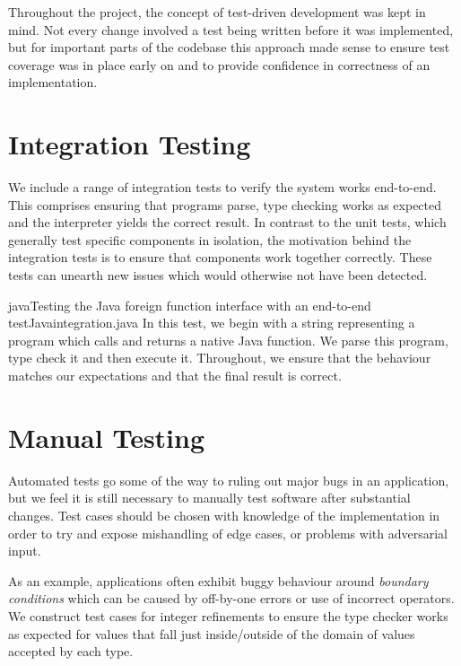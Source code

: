 \documentclass[a4paper,openany,12pt]{book}
\begin{document}
Throughout the project, the concept of test-driven development was kept in mind.
Not every change involved a test being written before it was implemented, but for important parts of the codebase this approach made sense to ensure test coverage was in place early on and to provide confidence in correctness of an implementation.


\section{Integration Testing}

We include a range of integration tests to verify the system works end-to-end.
This comprises ensuring that programs parse, type checking works as expected and the interpreter yields the correct result.
In contrast to the unit tests, which generally test specific components in isolation, the motivation behind the integration tests is to ensure that components work together correctly.
These tests can unearth new issues which would otherwise not have been detected.

\begin{mycodefile}{java}{\label{code:integration:1}Testing the Java foreign function interface with an end-to-end test}{Java}{integration.java}
In this test, we begin with a string representing a program which calls and returns a native Java function.
We parse this program, type check it and then execute it.
Throughout, we ensure that the behaviour matches our expectations and that the final result is correct.
\end{mycodefile}

\section{Manual Testing}

Automated tests go some of the way to ruling out major bugs in an application, but we feel it is still necessary to manually test software after substantial changes.
Test cases should be chosen with knowledge of the implementation in order to try and expose mishandling of edge cases, or problems with adversarial input.

As an example, applications often exhibit buggy behaviour around \emph{boundary conditions} which can be caused by off-by-one errors or use of incorrect operators.
We construct test cases for integer refinements to ensure the type checker works as expected for values that fall just inside/outside of the domain of values accepted by each type.
\end{document}
